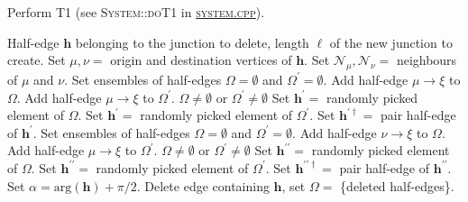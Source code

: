 \documentclass[aps, superscriptaddress, notitlepage, longbibliography]{revtex4-1}
\begin{document}
\begin{algorithm}[H]
\caption{Perform T1 (see \textsc{System::doT1} in \href{../src/cells/system.cpp}{\textsc{system.cpp}}).}
\label{alg:t1}
\begin{algorithmic}[1]
\REQUIRE Half-edge $\boldsymbol{h}$ belonging to the junction to delete, length $\ell$ of the new junction to create.
\STATE Set $\mu, \nu =$ origin and destination vertices of $\boldsymbol{h}$.
\STATE Set $\mathcal{N}_{\mu}, \mathcal{N}_{\nu} =$ neighbours of $\mu$ and $\nu$. 
\STATE Set ensembles of half-edges $\Omega = \emptyset$ and $\Omega^{\prime} = \emptyset$.
        \STATE Add half-edge $\mu \to \xi$ to $\Omega$.
    \ENDIF
        \STATE Add half-edge $\mu \to \xi$ to $\Omega^{\prime}$.
    \ENDIF
\ENDFOR
\ASSERT $\Omega \neq \emptyset$ or $\Omega^{\prime} \neq \emptyset$
\IF{$\Omega \neq \emptyset$}
    \STATE Set $\boldsymbol{h}^{\prime} =$ randomly picked element of $\Omega$. 
\ELSE
    \STATE Set $\boldsymbol{h}^{\prime} =$ randomly picked element of $\Omega^{\prime}$.
\ENDIF
\STATE Set $\boldsymbol{h}^{\prime\dagger} =$ pair half-edge of $\boldsymbol{h}^{\prime}$. 
\STATE Set ensembles of half-edges $\Omega = \emptyset$ and $\Omega^{\prime} = \emptyset$.
        \STATE Add half-edge $\nu \to \xi$ to $\Omega$.
    \ENDIF
        \STATE Add half-edge $\mu \to \xi$ to $\Omega^{\prime}$.
    \ENDIF
\ENDFOR
\ASSERT $\Omega \neq \emptyset$ or $\Omega^{\prime} \neq \emptyset$
\IF{$\Omega \neq \emptyset$}
    \STATE Set $\boldsymbol{h}^{\prime\prime} =$ randomly picked element of $\Omega$.
\ELSE
    \STATE Set $\boldsymbol{h}^{\prime\prime} =$ randomly picked element of $\Omega^{\prime}$.
\ENDIF
\STATE Set $\boldsymbol{h}^{\prime\prime\dagger} =$ pair half-edge of $\boldsymbol{h}^{\prime\prime}$.
\STATE Set $\alpha = \mathrm{arg}(\boldsymbol{h}) + \pi/2$.
\STATE Delete edge containing $\boldsymbol{h}$, set $\Omega =$ \{deleted half-edges\}. %

\end{algorithmic}
\end{algorithm}
\end{document}
